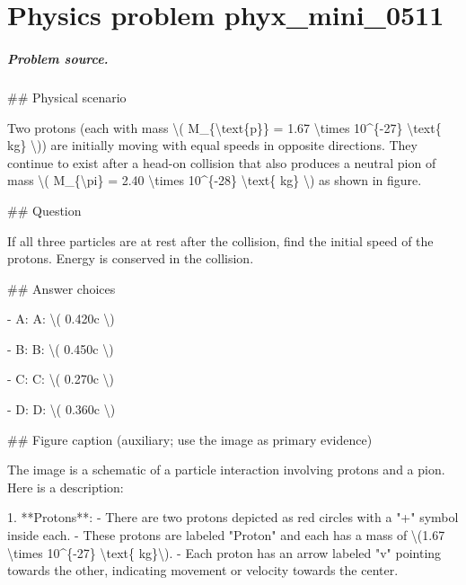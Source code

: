 
\chapter{Physics problem phyx\_mini\_0511}
\label{ch:PhyXMiniProblems_problem_phyx_mini_0511}

\paragraph{Problem source.}
\#\# Physical scenario

Two protons (each with mass \textbackslash{}( M\_\{\textbackslash{}text\{p\}\} = 1.67 \textbackslash{}times 10\textasciicircum{}\{-27\} \textbackslash{}text\{ kg\} \textbackslash{})) are initially moving with equal speeds in opposite directions. They continue to exist after a head-on collision that also produces a neutral pion of mass \textbackslash{}( M\_\{\textbackslash{}pi\} = 2.40 \textbackslash{}times 10\textasciicircum{}\{-28\} \textbackslash{}text\{ kg\} \textbackslash{}) as shown in figure.

\#\# Question

If all three particles are at rest after the collision, find the initial speed of the protons. Energy is conserved in the collision.

\#\# Answer choices

- A: A: \textbackslash{}( 0.420c \textbackslash{})

- B: B: \textbackslash{}( 0.450c \textbackslash{})

- C: C: \textbackslash{}( 0.270c \textbackslash{})

- D: D: \textbackslash{}( 0.360c \textbackslash{})

\#\# Figure caption (auxiliary; use the image as primary evidence)

The image is a schematic of a particle interaction involving protons and a pion. Here is a description:

1. **Protons**:
   - There are two protons depicted as red circles with a "+" symbol inside each.
   - These protons are labeled "Proton" and each has a mass of \textbackslash{}(1.67 \textbackslash{}times 10\textasciicircum{}\{-27\} \textbackslash{}text\{ kg\}\textbackslash{}).
   - Each proton has an arrow labeled "v" pointing towards the other, indicating movement or velocity towards the center.


